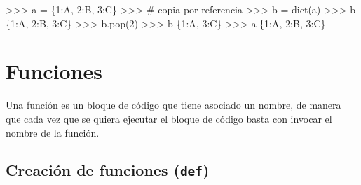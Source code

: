 \documentclass[
  spanish,
  a4paper,
]{scrreport}
\newenvironment{Shaded}{\begin{snugshade}}{\end{snugshade}}
\newcommand{\BuiltInTok}[1]{\textcolor[rgb]{0.00,0.23,0.31}{#1}}
\newcommand{\CommentTok}[1]{\textcolor[rgb]{0.37,0.37,0.37}{#1}}
\newcommand{\DecValTok}[1]{\textcolor[rgb]{0.68,0.00,0.00}{#1}}
\newcommand{\NormalTok}[1]{\textcolor[rgb]{0.00,0.23,0.31}{#1}}
\newcommand{\OperatorTok}[1]{\textcolor[rgb]{0.37,0.37,0.37}{#1}}
\newcommand{\StringTok}[1]{\textcolor[rgb]{0.13,0.47,0.30}{#1}}
\begin{document}
\begin{Shaded}
\begin{Highlighting}[]
\OperatorTok{\textgreater{}\textgreater{}\textgreater{}}\NormalTok{ a }\OperatorTok{=}\NormalTok{ \{}\DecValTok{1}\NormalTok{:}\StringTok{\textquotesingle{}A\textquotesingle{}}\NormalTok{, }\DecValTok{2}\NormalTok{:}\StringTok{\textquotesingle{}B\textquotesingle{}}\NormalTok{, }\DecValTok{3}\NormalTok{:}\StringTok{\textquotesingle{}C\textquotesingle{}}\NormalTok{\}}
\OperatorTok{\textgreater{}\textgreater{}\textgreater{}} \CommentTok{\# copia por referencia}
\OperatorTok{\textgreater{}\textgreater{}\textgreater{}}\NormalTok{ b }\OperatorTok{=} \BuiltInTok{dict}\NormalTok{(a)}
\OperatorTok{\textgreater{}\textgreater{}\textgreater{}}\NormalTok{ b}
\NormalTok{\{}\DecValTok{1}\NormalTok{:}\StringTok{\textquotesingle{}A\textquotesingle{}}\NormalTok{, }\DecValTok{2}\NormalTok{:}\StringTok{\textquotesingle{}B\textquotesingle{}}\NormalTok{, }\DecValTok{3}\NormalTok{:}\StringTok{\textquotesingle{}C\textquotesingle{}}\NormalTok{\}}
\OperatorTok{\textgreater{}\textgreater{}\textgreater{}}\NormalTok{ b.pop(}\DecValTok{2}\NormalTok{)}
\OperatorTok{\textgreater{}\textgreater{}\textgreater{}}\NormalTok{ b}
\NormalTok{\{}\DecValTok{1}\NormalTok{:}\StringTok{\textquotesingle{}A\textquotesingle{}}\NormalTok{, }\DecValTok{3}\NormalTok{:}\StringTok{\textquotesingle{}C\textquotesingle{}}\NormalTok{\}}
\OperatorTok{\textgreater{}\textgreater{}\textgreater{}}\NormalTok{ a}
\NormalTok{\{}\DecValTok{1}\NormalTok{:}\StringTok{\textquotesingle{}A\textquotesingle{}}\NormalTok{, }\DecValTok{2}\NormalTok{:}\StringTok{\textquotesingle{}B\textquotesingle{}}\NormalTok{, }\DecValTok{3}\NormalTok{:}\StringTok{\textquotesingle{}C\textquotesingle{}}\NormalTok{\}}
\end{Highlighting}
\end{Shaded}


\chapter{Funciones}\label{funciones}

Una función es un bloque de código que tiene asociado un nombre, de
manera que cada vez que se quiera ejecutar el bloque de código basta con
invocar el nombre de la función.

\section{\texorpdfstring{Creación de funciones
(\texttt{def})}{Creación de funciones (def)}}\label{creaciuxf3n-de-funciones-def}
\end{document}
